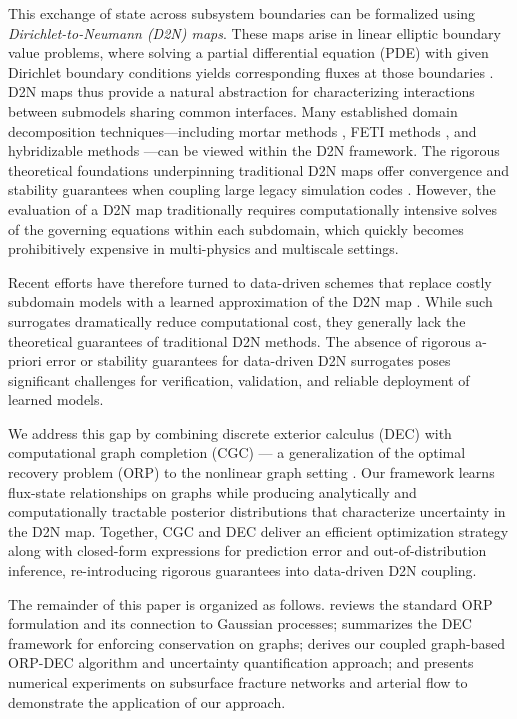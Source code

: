 \documentclass{article}
\theoremstyle{definition}
\theoremstyle{remark}
\begin{document}
This exchange of state across subsystem boundaries can be formalized using \textit{Dirichlet-to-Neumann (D2N) maps}. These maps arise in linear elliptic boundary value problems, where solving a partial differential equation (PDE) with given Dirichlet boundary conditions yields corresponding fluxes at those boundaries \cite{natarajan1995domain}. D2N maps thus provide a natural abstraction for characterizing interactions between submodels sharing common interfaces. Many established domain decomposition techniques---including mortar methods \cite{arbogast2007multiscale,bernardi1993domain}, FETI methods \cite{farhat2001feti}, and hybridizable methods \cite{cockburn2009unified}---can be viewed within the D2N framework. The rigorous theoretical foundations underpinning traditional D2N maps offer convergence and stability guarantees when coupling large legacy simulation codes \cite{jiang2024structure,sockwell2020interface}.
However, the evaluation of a D2N map traditionally requires computationally intensive solves of the governing equations within each subdomain, which quickly becomes prohibitively expensive in multi-physics and multiscale settings.

Recent efforts have therefore turned to data-driven schemes that replace costly subdomain models with a learned approximation of the D2N map \cite{bochev2024dynamic,hall2021ginns,jiang2024structure}. While such surrogates dramatically reduce computational cost, they generally lack the theoretical guarantees of traditional D2N methods. The absence of rigorous a-priori error or stability guarantees for data-driven D2N surrogates poses significant challenges for verification, validation, and reliable deployment of learned models.


We address this gap by combining discrete exterior calculus (DEC) \cite{TRASK2022110969} with computational graph completion (CGC) --- a generalization of the optimal recovery problem (ORP) to the nonlinear graph setting \cite{owhadi2022computational}. Our framework learns flux-state relationships on graphs while producing analytically and computationally tractable posterior distributions that characterize uncertainty in the D2N map. Together, CGC and DEC deliver an efficient optimization strategy along with closed-form expressions for prediction error and out-of-distribution inference, re-introducing rigorous guarantees into data-driven D2N coupling.


The remainder of this paper is organized as follows.  reviews the standard ORP formulation and its connection to Gaussian processes;  summarizes the DEC framework for enforcing conservation on graphs;  derives our coupled graph-based ORP-DEC algorithm and uncertainty quantification approach; and  presents numerical experiments on subsurface fracture networks and arterial flow to demonstrate the application of our approach.
\end{document}
